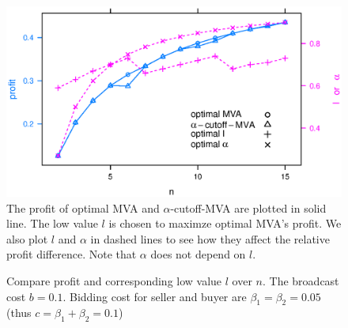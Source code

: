 \begin{figure}
\centering
    \includegraphics[width=\linewidth]{figures/cutoff_.2_.1_15.eps}
    \caption{The profit of optimal MVA and $\alpha$-cutoff-MVA are plotted in
    solid line.  The low value $l$ is chosen to maximze optimal MVA's profit.
    We also plot $l$ and $\alpha$ in dashed lines to see how they affect the
    relative profit difference.  Note that $\alpha$ does not depend on
    $l$.}\label{fig:cutoff}
\end{figure}

\begin{figure}
\centering
  \caption{Compare profit and corresponding low value $l$ over $n$. The
  broadcast cost $b = 0.1$. Bidding cost for seller and buyer are $\beta_1 =
  \beta_2 = 0.05$ (thus $c = \beta_1+\beta_2 = 0.1$)}\label{fig:general}
\end{figure}

